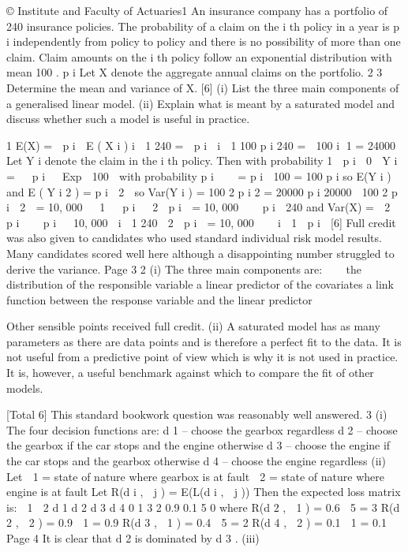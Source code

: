 \documentclass[a4paper,12pt]{article}
\begin{document}
\begin{enumerate}

© Institute and Faculty of Actuaries1
An insurance company has a portfolio of 240 insurance policies. The probability of a
claim on the i th policy in a year is p i independently from policy to policy and there is
no possibility of more than one claim. Claim amounts on the i th policy follow an
exponential distribution with mean 100 .
p i
Let X denote the aggregate annual claims on the portfolio.
2
3
Determine the mean and variance of X. [6]
(i) List the three main components of a generalised linear model. 
(ii) Explain what is meant by a saturated model and discuss whether such a model
is useful in practice.


\newpage


1
E(X)
=
 p i  E ( X i )
i  1
240
=
 p i 
i  1
100
p i
240
=
 100
i 1
= 24000
Let Y i denote the claim in the i th policy. Then
with probability 1  p i
 0

Y i = 
 p i 
 Exp  100  with probability p i



= p i 
100
= 100
p i
so E(Y i )
and E ( Y i 2 ) = p i  2 
so Var(Y i ) =
100 2
p i 2
=
20000
p i
20000
 100 2
p i
 2

= 10, 000   1 
 p i

 2  p i 
= 10, 000 

 p i 
240
and
Var(X) =
 2  p i 

 p i 
 10, 000 
i  1
240
 2  p i 
= 10, 000  

i  1  p i 
[6]
Full credit was also given to candidates who used standard individual risk model results.
Many candidates scored well here although a disappointing number struggled to derive the
variance.
Page 3%
2
(i)
The three main components are:



the distribution of the responsible variable
a linear predictor of the covariates
a link function between the response variable and the linear predictor

Other sensible points received full credit.
(ii)
A saturated model has as many parameters as there are data points and is
therefore a perfect fit to the data.
It is not useful from a predictive point of view which is why it is not used in
practice.
It is, however, a useful benchmark against which to compare the fit of other
models.

[Total 6]
This standard bookwork question was reasonably well answered.
3
(i)
The four decision functions are:
d 1 – choose the gearbox regardless
d 2 – choose the gearbox if the car stops and the engine otherwise
d 3 – choose the engine if the car stops and the gearbox otherwise
d 4 – choose the engine regardless
(ii)
Let  1 = state of nature where gearbox is at fault
 2 = state of nature where engine is at fault
Let R(d i ,  j ) = E(L(d i ,  j ))
Then the expected loss matrix is:
 1
 2
d 1 d 2 d 3 d 4
0
1 3
2
0.9 0.1 5
0
where
R(d 2 ,  1 ) = 0.6  5 = 3
R(d 2 ,  2 ) = 0.9  1 = 0.9
R(d 3 ,  1 ) = 0.4  5 = 2
R(d 4 ,  2 ) = 0.1  1 = 0.1
Page 4
It is clear that d 2 is dominated by d 3 .
(iii)


\end{enumerate}
\end{document}
